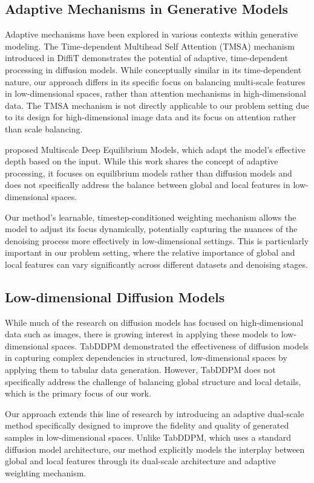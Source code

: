 \documentclass{article} %
\begin{document}
\subsection{Adaptive Mechanisms in Generative Models}
Adaptive mechanisms have been explored in various contexts within generative modeling. The Time-dependent Multihead Self Attention (TMSA) mechanism introduced in DiffiT \cite{Hatamizadeh2023DiffiTDV} demonstrates the potential of adaptive, time-dependent processing in diffusion models. While conceptually similar in its time-dependent nature, our approach differs in its specific focus on balancing multi-scale features in low-dimensional spaces, rather than attention mechanisms in high-dimensional data. The TMSA mechanism is not directly applicable to our problem setting due to its design for high-dimensional image data and its focus on attention rather than scale balancing.

\citet{Bai2020MultiscaleDE} proposed Multiscale Deep Equilibrium Models, which adapt the model's effective depth based on the input. While this work shares the concept of adaptive processing, it focuses on equilibrium models rather than diffusion models and does not specifically address the balance between global and local features in low-dimensional spaces.

Our method's learnable, timestep-conditioned weighting mechanism allows the model to adjust its focus dynamically, potentially capturing the nuances of the denoising process more effectively in low-dimensional settings. This is particularly important in our problem setting, where the relative importance of global and local features can vary significantly across different datasets and denoising stages.

\subsection{Low-dimensional Diffusion Models}
While much of the research on diffusion models has focused on high-dimensional data such as images, there is growing interest in applying these models to low-dimensional spaces. TabDDPM \cite{Kotelnikov2022TabDDPMMT} demonstrated the effectiveness of diffusion models in capturing complex dependencies in structured, low-dimensional spaces by applying them to tabular data generation. However, TabDDPM does not specifically address the challenge of balancing global structure and local details, which is the primary focus of our work.

Our approach extends this line of research by introducing an adaptive dual-scale method specifically designed to improve the fidelity and quality of generated samples in low-dimensional spaces. Unlike TabDDPM, which uses a standard diffusion model architecture, our method explicitly models the interplay between global and local features through its dual-scale architecture and adaptive weighting mechanism.
\end{document}
